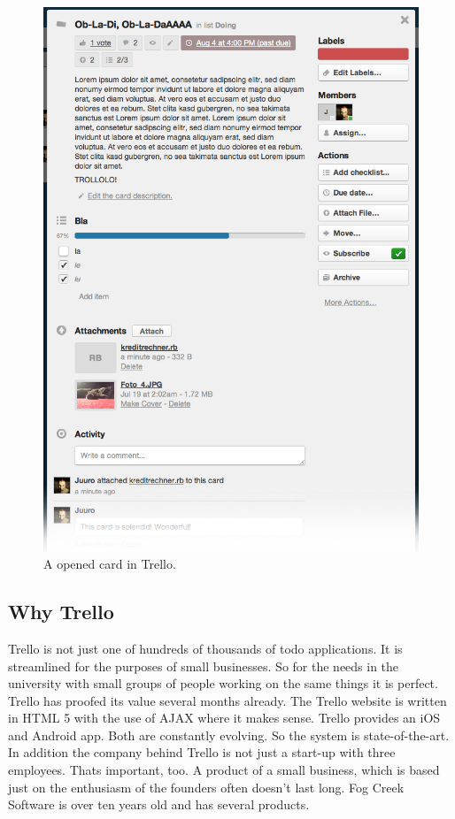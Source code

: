 \begin{figure}[htb]
\centering
\includegraphics[width=\textwidth]{figures/trello-card}
\caption{A opened card in Trello.}
\label{fig:trello-card}
\end{figure}

\subsection{Why Trello}
Trello is not just one of hundreds of thousands of todo applications. It is streamlined for the purposes of small businesses. So for the needs in the university with small groups of people working on the same things it is perfect. Trello has proofed its value several months already. The Trello website is written in HTML 5 with the use of AJAX where it makes sense. Trello provides an iOS \cite{trello:ios} and Android \cite{trello:android} app. Both are constantly evolving. So the system is state-of-the-art. In addition the company behind Trello is not just a start-up with three employees. Thats important, too. A product of a small business, which is based just on the enthusiasm of the founders often doesn't last long. Fog Creek Software is over ten years old and has several products.

